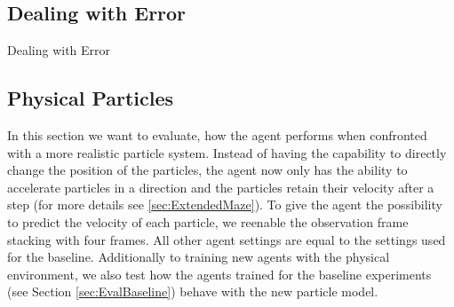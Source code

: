 \subsection{Dealing with Error} \label{sec:EvalError}
Dealing with Error

\subsection{Physical Particles} \label{sec:EvalPhysical}
In this section we want to evaluate, how the agent performs when confronted with a more realistic particle system. Instead of having the capability to directly change the position of the particles, the agent now only has the ability to accelerate particles in a direction and the particles retain their velocity after a step (for more details see \ref{sec:ExtendedMaze}). To give the agent the possibility to predict the velocity of each particle, we reenable the observation frame stacking with four frames. All other agent settings are equal to the settings used for the baseline. Additionally to training new agents with the physical environment, we also test how the agents trained for the baseline experiments (see Section \ref{sec:EvalBaseline}) behave with the new particle model.

